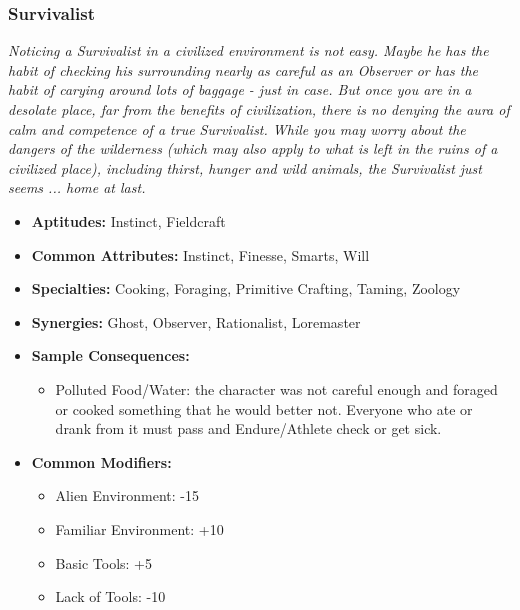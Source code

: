 \subsubsection{Survivalist}\label{Survivalist}
\textit{Noticing a Survivalist in a civilized environment is not easy.
Maybe he has the habit of checking his surrounding nearly as careful as an Observer or has the habit of carying around lots of baggage - just in case.
But once you are in a desolate place, far from the benefits of civilization, there is no denying the aura of calm and competence of a true Survivalist.
While you may worry about the dangers of the wilderness (which may also apply to what is left in the ruins of a civilized place), including thirst, hunger and wild animals, the Survivalist just seems ... home at last.}
\begin{itemize}
	\item \textbf{Aptitudes:} Instinct, Fieldcraft
	\item \textbf{Common Attributes:} Instinct, Finesse, Smarts, Will
	\item \textbf{Specialties:} Cooking, Foraging, Primitive Crafting, Taming, Zoology 	
	\item \textbf{Synergies:} Ghost, Observer, Rationalist, Loremaster
	\item \textbf{Sample Consequences:} 
	\begin{itemize}
		\item Polluted Food/Water: the character was not careful enough and foraged or cooked something that he would better not. Everyone who ate or drank from it must pass and Endure/Athlete check or get sick.
	\end{itemize}
	\item \textbf{Common Modifiers:}
	\begin{itemize}
		\item Alien Environment: -15
		\item Familiar Environment: +10
		\item Basic Tools: +5
		\item Lack of Tools: -10
	\end{itemize}
\end{itemize}

